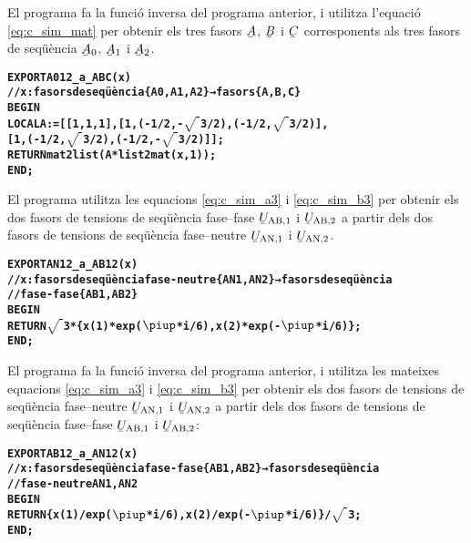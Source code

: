 El programa  fa la funció inversa del programa anterior, i utilitza l'equació \eqref{eq:c_sim_mat} per obtenir els tres fasors
$\cmplx{A}$, $\cmplx{B}$ i $\cmplx{C}$  corresponents als tres fasors de seqüència
$\cmplx{A}_0$, $\cmplx{A}_1$ i  $\cmplx{A}_2$.
\vspace{-1cm}
\begin{alltt}
\bfseries
{}
    EXPORT A012_a_ABC(x)
    // x:fasors de seqüència \{A0,A1,A2\} → fasors \{A,B,C\}
    BEGIN
      LOCAL A:=[[1,1,1],[1,(-1/2,-\(\sqrt{\phantom{|}}\)3/2),(-1/2,\(\sqrt{\phantom{|}}\)3/2)],
                [1,(-1/2,\(\sqrt{\phantom{|}}\)3/2),(-1/2,-\(\sqrt{\phantom{|}}\)3/2)]];
      RETURN mat2list(A*list2mat(x,1));
    END;
\end{alltt}

El programa  utilitza les equacions  \eqref{eq:c_sim_a3} i \eqref{eq:c_sim_b3} per obtenir els dos fasors de tensions de seqüència fase--fase $\cmplx{U}\ped{AB,1}$ i  $\cmplx{U}\ped{AB,2}$ a partir dels dos fasors de tensions de seqüència fase--neutre $\cmplx{U}\ped{AN,1}$ i $\cmplx{U}\ped{AN,2}$.
\pagebreak
\begin{alltt}
\bfseries
{}
    EXPORT AN12_a_AB12(x)
    // x:fasors de seqüència fase-neutre \{AN1,AN2\} → fasors de seqüència
    // fase-fase \{AB1,AB2\}
    BEGIN
      RETURN \(\sqrt{\phantom{|}}\)3*\{x(1)*exp(\(\piup\)*i/6),x(2)*exp(-\(\piup\)*i/6)\};
    END;
\end{alltt}

El programa  fa la funció inversa del programa anterior, i utilitza les mateixes equacions  \eqref{eq:c_sim_a3} i \eqref{eq:c_sim_b3} per obtenir els dos fasors de tensions de seqüència fase--neutre $\cmplx{U}\ped{AN,1}$ i $\cmplx{U}\ped{AN,2}$ a partir dels dos fasors de tensions de seqüència fase--fase $\cmplx{U}\ped{AB,1}$ i  $\cmplx{U}\ped{AB,2}$:
\vspace{-1cm}
\begin{alltt}
\bfseries
{}
    EXPORT AB12_a_AN12(x)
    // x:fasors de seqüència fase-fase \{AB1,AB2\} → fasors de seqüència
    // fase-neutre {AN1,AN2}
    BEGIN
      RETURN \{x(1)/exp(\(\piup\)*i/6),x(2)/exp(-\(\piup\)*i/6)\}/\(\sqrt{\phantom{|}}\)3;
    END;
\end{alltt}


